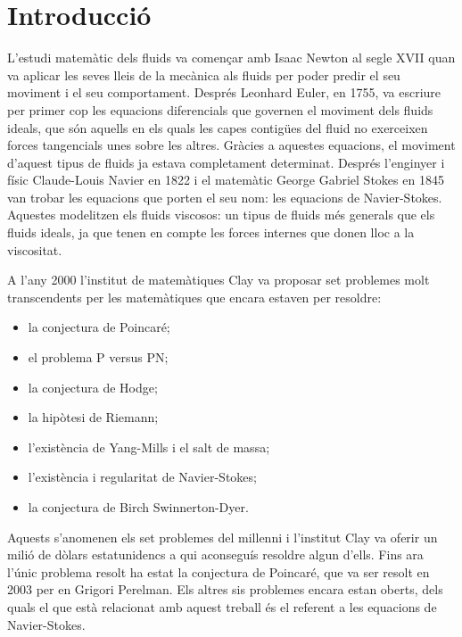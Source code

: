 \documentclass{article}
\numberwithin{equation}{section}
\begin{document}
\section{Introducci\'{o}}

L'estudi matem\`{a}tic dels fluids va comen\c{c}ar amb Isaac Newton al segle XVII quan va aplicar les seves lleis de la mec\`{a}nica als fluids per poder predir el seu moviment i el seu comportament. Despr\'{e}s Leonhard Euler, en 1755, va escriure per primer cop les equacions diferencials que governen el moviment dels fluids ideals, que s\'{o}n aquells en els quals les capes contig\"{u}es del fluid no exerceixen forces tangencials unes sobre les altres. Gr\`{a}cies a aquestes equacions, el moviment d'aquest tipus de fluids ja estava completament determinat. Despr\'{e}s l'enginyer i f\'{i}sic Claude-Louis Navier en 1822 i el matem\`{a}tic George Gabriel Stokes en 1845 van trobar les equacions que porten el seu nom: les equacions de Navier-Stokes. Aquestes modelitzen els fluids viscosos: un tipus de fluids m\'{e}s generals que els fluids ideals, ja que tenen en compte les forces internes que donen lloc a la viscositat.
\vspace{3mm}

A l'any 2000 l'institut de matem\`{a}tiques Clay va proposar set problemes molt transcendents per les matem\`{a}tiques que encara estaven per resoldre:
\begin{itemize}
\item la conjectura de Poincar\'{e};
\item el problema P versus PN;
\item la conjectura de Hodge;
\item la hip\`{o}tesi de Riemann;
\item l'exist\`{e}ncia de Yang-Mills i el salt de massa;
\item l'exist\`{e}ncia i regularitat de Navier-Stokes;
\item la conjectura de Birch Swinnerton-Dyer.
\end{itemize}

Aquests s'anomenen els set problemes del mil\textperiodcentered lenni i l'institut Clay va oferir un mili\'{o} de d\`{o}lars estatunidencs a qui aconsegu\'{i}s resoldre algun d'ells. Fins ara l'\'{u}nic problema resolt ha estat la conjectura de Poincar\'{e}, que va ser resolt en 2003 per en Grigori Perelman. Els altres sis problemes encara estan oberts, dels quals el que est\`{a} relacionat amb aquest treball \'{e}s el referent a les equacions de Navier-Stokes.
\end{document}
